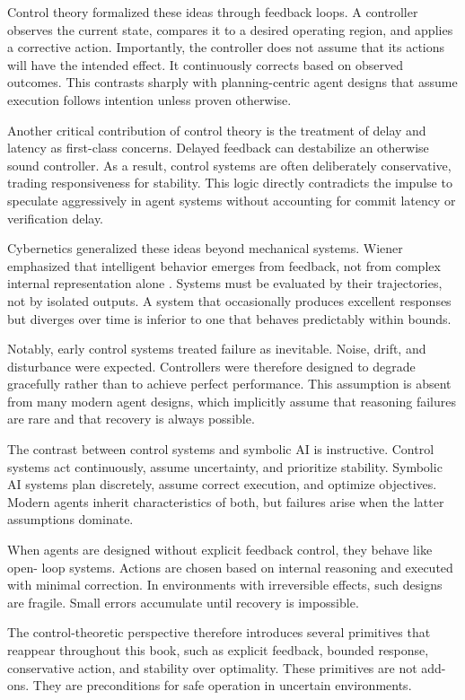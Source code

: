 Control theory formalized these ideas through feedback loops. A controller observes
the current state, compares it to a desired operating region, and applies a
corrective action. Importantly, the controller does not assume that its actions
will have the intended effect. It continuously corrects based on observed
outcomes. This contrasts sharply with planning-centric agent designs that assume
execution follows intention unless proven otherwise.

Another critical contribution of control theory is the treatment of delay and
latency as first-class concerns. Delayed feedback can destabilize an otherwise
sound controller. As a result, control systems are often deliberately conservative,
trading responsiveness for stability. This logic directly contradicts the
impulse to speculate aggressively in agent systems without accounting for commit
latency or verification delay.

Cybernetics generalized these ideas beyond mechanical systems. Wiener emphasized
that intelligent behavior emerges from feedback, not from complex internal
representation alone \cite{wiener1948cybernetics}. Systems must be evaluated by
their trajectories, not by isolated outputs. A system that occasionally produces
excellent responses but diverges over time is inferior to one that behaves
predictably within bounds.

Notably, early control systems treated failure as inevitable. Noise, drift, and
disturbance were expected. Controllers were therefore designed to degrade
gracefully rather than to achieve perfect performance. This assumption is absent
from many modern agent designs, which implicitly assume that reasoning failures are
rare and that recovery is always possible.

The contrast between control systems and symbolic AI is instructive. Control
systems act continuously, assume uncertainty, and prioritize stability. Symbolic
AI systems plan discretely, assume correct execution, and optimize objectives.
Modern agents inherit characteristics of both, but failures arise when the latter
assumptions dominate.

When agents are designed without explicit feedback control, they behave like open-
loop systems. Actions are chosen based on internal reasoning and executed with
minimal correction. In environments with irreversible effects, such designs are
fragile. Small errors accumulate until recovery is impossible.

The control-theoretic perspective therefore introduces several primitives that
reappear throughout this book, such as explicit feedback, bounded response, conservative
action, and stability over optimality. These primitives are not add-ons. They are
preconditions for safe operation in uncertain environments.

